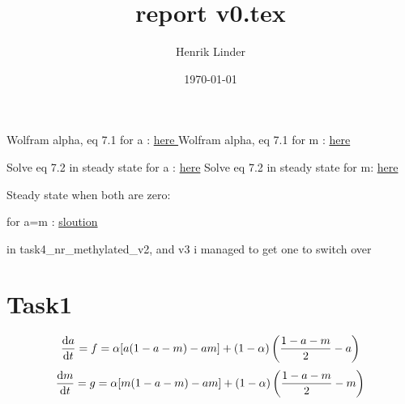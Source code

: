\documentclass{article}
\title{report v0.tex }
\author{Henrik Linder}
\date{\today}
\begin{document}
\maketitle

Wolfram alpha, eq 7.1 for a  : \href{https://www.wolframalpha.com/input?i=solve+0+\%3D+alpha*\%28a*\%281-a-m\%29+-+a*m\%29+\%2B+\%281+-+alpha\%29*\%28\%281-a-m\%29\%2F2+-+a\%29+for+a+}{here }
Wolfram alpha, eq 7.1 for m  : \href{https://www.wolframalpha.com/input?i=solve+0+%3D+alpha*%28a*%281-a-m%29+-+a*m%29+%2B+%281+-+alpha%29*%28%281-a-m%29%2F2+-+a%29+for+m}{here }

Solve eq 7.2 in steady state for a : \href{https://www.wolframalpha.com/input?i=solve+0+\%3D+alpha*\%28m*\%281-a-m\%29+-+a*m\%29+\%2B+\%281+-+alpha\%29*\%28\%281-a-m\%29\%2F2+-+a\%29+for+a+}{here}
Solve eq 7.2 in steady state for m: \href{https://www.wolframalpha.com/input?i=solve+0+%3D+alpha*%28m*%281-a-m%29+-+a*m%29+%2B+%281+-+alpha%29*%28%281-a-m%29%2F2+-+a%29+for+m}{here}




Steady state when both are zero: 

for a=m : 
\href{https://www.wolframalpha.com/input?i=solve+0+%3D+alpha*%28a*%281-a-a%29+-+a*a%29+%2B+%281+-+alpha%29*%28%281-a-a%29%2F2+-+a%29+for+a+}{sloution}







in task4\_nr\_methylated\_v2, and v3 i managed to get one to switch over 




\section{Task1}


\begin{equation}
	\dv {a}{t} = f = \alpha[a(1-a-m) - am] + (1-\alpha )\left(\frac{1-a-m}{2}  - a\right)
\end{equation}
\begin{equation}
	\dv {m}{t} = g = \alpha[m(1-a-m) - am] + (1-\alpha )\left(\frac{1-a-m}{2}  - m\right)
\end{equation}
\end{document}
